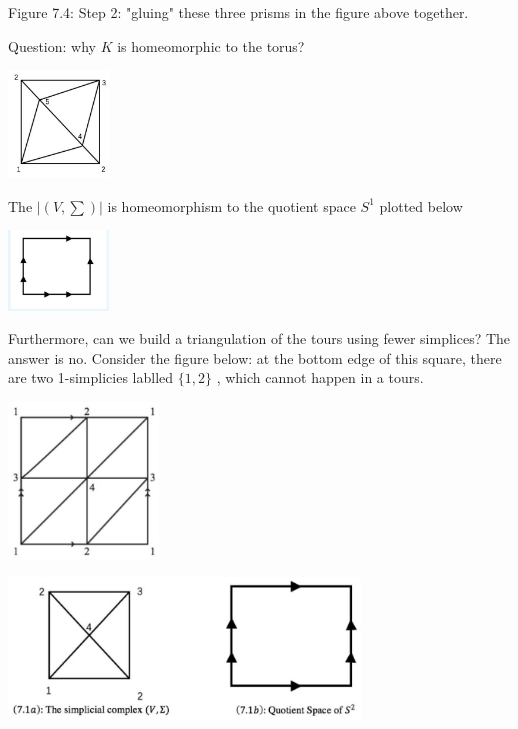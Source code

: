 Figure 7.4: Step 2: "gluing" these three prisms in the figure above together.

Question: why \(K\) is homeomorphic to the torus?

\begin{center}
\includegraphics[max width=0.2\textwidth]{images/bo_d2bcsrref24c73avs720_78_787_416_344_369_0.jpg}
\end{center}
\hspace*{3em} 

The \(\left| \left( {V,\sum }\right) \right|\) is homeomorphism to the quotient space \({S}^{1}\) plotted below

\begin{center}
\includegraphics[max width=0.2\textwidth]{images/bo_d2bcsrref24c73avs720_78_805_984_350_278_0.jpg}
\end{center}
\hspace*{3em} 

Furthermore, can we build a triangulation of the tours using fewer simplices? The answer is no. Consider the figure below: at the bottom edge of this square, there are two 1-simplicies lablled \(\{ 1,2\}\) , which cannot happen in a tours.

\begin{center}
\includegraphics[max width=0.3\textwidth]{images/bo_d2bcsrref24c73avs720_78_773_1700_396_411_0.jpg}
\end{center}
\hspace*{3em} 

\begin{center}
\includegraphics[max width=0.7\textwidth]{images/bo_d2bcsrref24c73avs720_79_347_434_929_377_0.jpg}
\end{center}
\hspace*{3em} 


